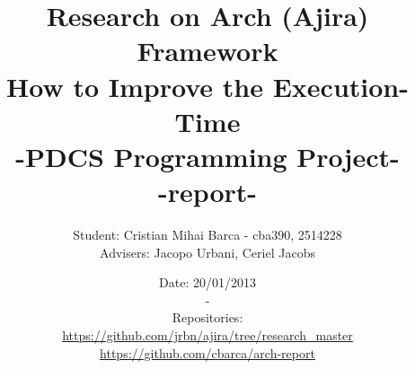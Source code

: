 \begin{titlepage}
\title{Research on Arch (Ajira) Framework \\ How to Improve the Execution-Time \\ -PDCS Programming Project-  \\ -report- \\}
\author{Student: Cristian Mihai Barca - cba390, 2514228 \\ Advisers: Jacopo Urbani, Ceriel Jacobs}
\date{Date: 20/01/2013 \\ - \\
Repositories: \\
\url{https://github.com/jrbn/ajira/tree/research_master}  \\
\url{https://github.com/cbarca/arch-report} }
\maketitle
\end{titlepage}
